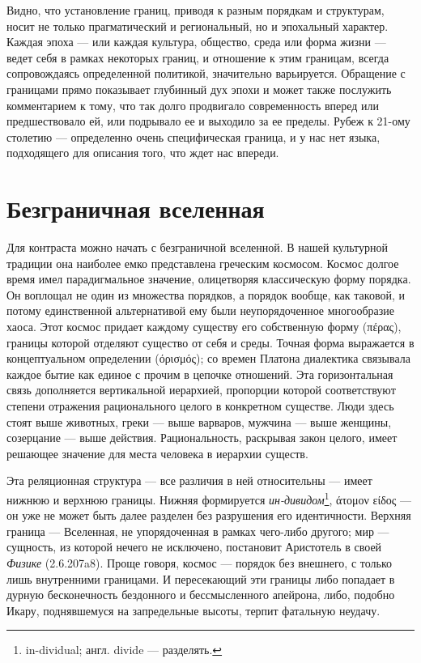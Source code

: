 \documentclass[12pt]{book}
\begin{document}
Видно, что установление границ, приводя к разным порядкам и структурам, носит не только прагматический и региональный, но и эпохальный характер. Каждая эпоха --- или каждая культура, общество, среда или форма жизни --- ведет себя в рамках некоторых границ, и отношение к этим границам, всегда сопровождаясь определенной политикой, значительно варьируется. Обращение с границами прямо показывает глубинный дух эпохи и может также послужить комментарием к тому, что так долго продвигало современность вперед или предшествовало ей, или подрывало ее и выходило за ее пределы. Рубеж к 21-ому столетию --- определенно очень специфическая граница, и у нас нет языка, подходящего для описания того, что ждет нас впереди.

\section{Безграничная вселенная}

Для контраста можно начать с безграничной вселенной. В нашей культурной традиции она наиболее емко представлена греческим космосом. Космос долгое время имел парадигмальное значение, олицетворяя классическую форму порядка. Он воплощал не один из множества порядков, а порядок вообще, как таковой, и потому единственной альтернативой ему были неупорядоченное многообразие хаоса. Этот космос придает каждому существу его собственную форму (πέρας), границы которой отделяют существо от себя и среды. Точная форма выражается в концептуальном определении (όρισμός); со времен Платона диалектика связывала каждое бытие как единое с прочим в цепочке отношений. Эта горизонтальная связь дополняется вертикальной иерархией, пропорции которой соответствуют степени отражения рационального целого в конкретном существе. Люди здесь стоят выше животных, греки --- выше варваров, мужчина --- выше женщины, созерцание --- выше действия. Рациональность, раскрывая закон целого, имеет решающее значение для места человека в иерархии существ.

Эта реляционная структура --- все различия в ней относительны --- имеет нижнюю и верхнюю границы. Нижняя формируется \textit{ин-дивидом}\footnote{in-dividual; англ. divide --- разделять.}, άτομον είδος --- он уже не может быть далее разделен без разрушения его идентичности. Верхняя граница --- Вселенная, не упорядоченная в рамках чего-либо другого; мир --- сущность, из которой нечего не исключено, постановит Аристотель в своей \textit{Физике} (2.6.207a8). Проще говоря, космос --- порядок без внешнего, с только лишь внутренними границами. И пересекающий эти границы либо попадает в дурную бесконечность бездонного и бессмысленного апейрона, либо, подобно Икару, поднявшемуся на запредельные высоты, терпит фатальную неудачу.
\end{document}
